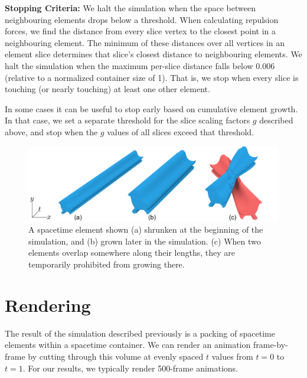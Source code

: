 \textbf{Stopping Criteria:} We halt the simulation when the space between
neighbouring elements drops below a threshold.  When calculating 
repulsion forces, we find the distance from every slice vertex
to the closest point in a neighbouring element.  The minimum of these
distances over all vertices in an element slice determines that slice's
closest distance to neighbouring elements.  We halt the simulation
when the maximum per-slice distance falls below 0.006 (relative to a normalized
container size of 1).  That is, we stop when every slice is touching
(or nearly touching) at least one other element.

In some cases it can be useful to stop early based on cumulative element
growth.  In that case, we set a separate threshold for the slice scaling
factors $g$ described above, and stop when the $g$ values of all
slices exceed that threshold.

\begin{figure}
\centering
\includegraphics[width=1.0\textwidth]{figures/animationpak/growth.pdf} 
\caption[Element growths]
{\label{fig_animationpak_growth} 
A spacetime element shown (a) shrunken at the beginning of the simulation,
and (b) grown later in the simulation. (c) When two elements overlap
somewhere along their lengths, they are temporarily prohibited from growing
there.
}
\end{figure}


\section{Rendering}
\label{animationpak_rendering}



The result of the simulation described previously is a packing of spacetime 
elements within a spacetime container.  We can render an
animation frame-by-frame by cutting through this volume at 
evenly spaced $t$ values from $t=0$ to $t=1$.  For our results, we
typically render 500-frame animations.


